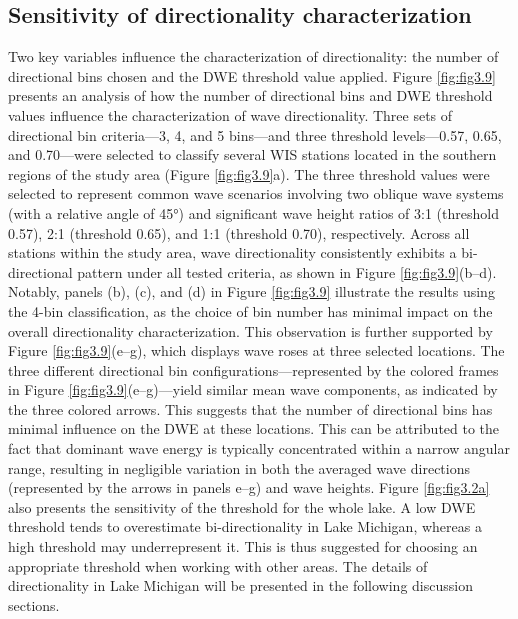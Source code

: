 \subsection{Sensitivity of directionality characterization}
\label{c3_Sensitivity of directionality characterization}
Two key variables influence the characterization of directionality: the number of directional bins chosen and the DWE threshold value applied. Figure \ref{fig:fig3.9} presents an analysis of how the number of directional bins and DWE threshold values influence the characterization of wave directionality. Three sets of directional bin criteria—3, 4, and 5 bins—and three threshold levels—0.57, 0.65, and 0.70—were selected to classify several WIS stations located in the southern regions of the study area (Figure \ref{fig:fig3.9}a). The three threshold values were selected to represent common wave scenarios involving two oblique wave systems (with a relative angle of 45°) and significant wave height ratios of 3:1 (threshold 0.57), 2:1 (threshold 0.65), and 1:1 (threshold 0.70), respectively. Across all stations within the study area, wave directionality consistently exhibits a bi-directional pattern under all tested criteria, as shown in Figure \ref{fig:fig3.9}(b–d). Notably, panels (b), (c), and (d) in Figure \ref{fig:fig3.9} illustrate the results using the 4-bin classification, as the choice of bin number has minimal impact on the overall directionality characterization. This observation is further supported by Figure \ref{fig:fig3.9}(e–g), which displays wave roses at three selected locations. The three different directional bin configurations—represented by the colored frames in Figure \ref{fig:fig3.9}(e–g)—yield similar mean wave components, as indicated by the three colored arrows. This suggests that the number of directional bins has minimal influence on the DWE at these locations. This can be attributed to the fact that dominant wave energy is typically concentrated within a narrow angular range, resulting in negligible variation in both the averaged wave directions (represented by the arrows in panels e–g) and wave heights. Figure \ref{fig:fig3.2a} also presents the sensitivity of the threshold for the whole lake. A low DWE threshold tends to overestimate bi-directionality in Lake Michigan, whereas a high threshold may underrepresent it. This is thus suggested for choosing an appropriate threshold when working with other areas. The details of directionality in Lake Michigan will be presented in the following discussion sections.

